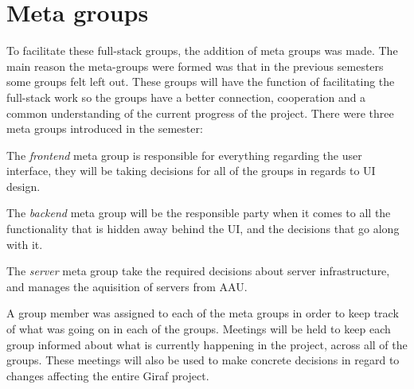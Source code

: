 \section{Meta groups}
To facilitate these full-stack groups, the addition of meta groups was made.
The main reason the meta-groups were formed was that in the previous semesters some groups felt left out.
These groups will have the function of facilitating the full-stack work so the groups have a better connection, cooperation and a common understanding of the current progress of the project.
There were three meta groups introduced in the semester:

The \textit{frontend} meta group is responsible for everything regarding the user interface, they will be taking decisions for all of the groups in regards to UI design.

The \textit{backend} meta group will be the responsible party when it comes to all the functionality that is hidden away behind the UI, and the decisions that go along with it.

The \textit{server} meta group take the required decisions about server infrastructure, and manages the aquisition of servers from AAU.

A group member was assigned to each of the meta groups in order to keep track of what was going on in each of the groups. Meetings will be held to keep each group informed about what is currently happening in the project, across all of the groups. These meetings will also be used to make concrete decisions in regard to changes affecting the entire Giraf project.